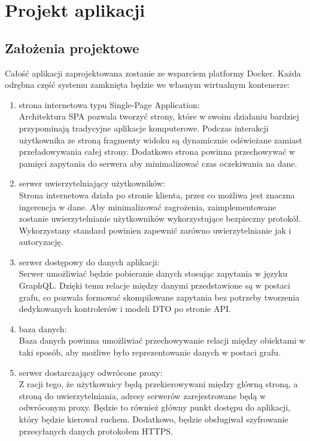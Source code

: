 \chapter{Projekt aplikacji}
\section{Założenia projektowe}
	Całość aplikacji zaprojektowana zostanie ze wsparciem platformy Docker.
	Każda odrębna część systemu zamknięta będzie we własnym wirtualnym kontenerze:
	\begin{enumerate}
		\item strona internetowa typu Single-Page Application:\\
			Architektura SPA pozwala tworzyć strony, które w swoim działaniu bardziej przypominają tradycyjne aplikacje komputerowe.
			Podczas interakcji użytkownika ze stroną fragmenty widoku są dynamicznie odświeżane zamiast przeładowywania całej strony.
			Dodatkowo strona powinna przechowywać w pamięci zapytania do serwera aby minimalizować czas oczekiwania na dane.

		\item serwer uwierzytelniający użytkowników:\\
			Strona internetowa działa po stronie klienta, przez co możliwa jest znaczna ingerencja w dane.
			Aby minimalizować zagrożenia, zaimplementowane zostanie uwierzytelnianie użytkowników wykorzystujące bezpieczny protokół.
			Wykorzystany standard powinien zapewnić zarówno uwierzytelnianie jak i autoryzację.

		\item serwer dostępowy do danych aplikacji:\\
			Serwer umożliwiać będzie pobieranie danych stosując zapytania w języku GraphQL\@.
			Dzięki temu relacje między danymi przedstawione są w postaci grafu,
			co pozwala formować skompilowane zapytania bez potrzeby tworzenia dedykowanych kontrolerów i modeli DTO po stronie API\@.

		\item baza danych:\\
			Baza danych powinna umożliwiać przechowywanie relacji między obiektami w taki sposób,
			aby możliwe było reprezentowanie danych w postaci grafu.

		\item serwer dostarczający odwrócone proxy:\\
			Z racji tego, że użytkownicy będą przekierowywani między główną stroną, a stroną do uwierzytelniania,
			adresy serwerów zarejestrowane będą w odwróconym proxy.
			Będzie to również główny punkt dostępu do aplikacji, który będzie kierował ruchem.
			Dodatkowo, będzie obsługiwał szyfrowanie przesyłanych danych protokołem HTTPS\@.
			
		\end{enumerate}
		
